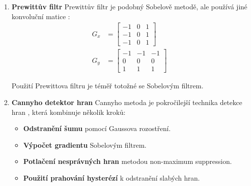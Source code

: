 \documentclass[FM,BP,CZ]{tulthesis}
\begin{document}
\begin{enumerate}
\begin{enumerate}
\begin{minipage}{0.48\linewidth}
\begin{align}
\begin{bmatrix}
-2 & 0 & 2 \\
-1 & 0 & 1
\end{bmatrix}
\end{align}
\end{minipage}
\hfill
\begin{minipage}{0.48\linewidth}
\begin{align}
G_y &= \begin{bmatrix}
-1 & -2 & -1 \\
0 & 0 & 0 \\
1 & 2 & 1
\end{bmatrix}
\end{align}
\end{minipage}



    \item \textbf{Prewittův filtr}
    \newline Prewittův filtr je podobný Sobelově metodě, ale používá jiné konvoluční matice \cite{gonzalez2018digital}:
\begin{align}
G_x &= \begin{bmatrix}
-1 & 0 & 1 \\
-1 & 0 & 1 \\
-1 & 0 & 1
\end{bmatrix} \\
G_y &= \begin{bmatrix}
-1 & -1 & -1 \\
0 & 0 & 0 \\
1 & 1 & 1
\end{bmatrix}
\end{align}

Použití Prewittova filtru je téměř totožné se Sobelovým filtrem.
    \item \textbf{Cannyho detektor hran}
    \newline Cannyho metoda je pokročilejší technika detekce hran \cite{canny1986computational}, která kombinuje několik kroků:
    \begin{itemize}
        \item \textbf{Odstranění šumu} pomocí Gaussova rozostření.
        \item \textbf{Výpočet gradientu} Sobelovým filtrem.
        \item \textbf{Potlačení nesprávných hran} metodou non-maximum suppression.
        \item \textbf{Použití prahování hysterézí} k odstranění slabých hran.
    \end{itemize}


\end{enumerate}
\end{enumerate}
\end{document}
